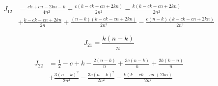 \begin{equation}
\label{J11}
\begin{split}
 J_{12} &= \frac{c k + c n - 2 k n - k}{4 n^2} + \frac{c (k - c k - c n + 2 k n)}{2 n^2} - \frac{k (k - c k - c n + 2 k n)}{2 n^2} \\
& + \frac{k - c k - c n + 2 k n}{2 n} + 
\frac{(n - k) (k - c k - c n + 2 k n)}{2 n^3} - \frac{c (n - k) (k - c k - c n + 2 k n)}{2 n^3}
\end{split}
\end{equation}

\begin{equation}
\label{J21}
J_{21} = \frac{k (n - k)}{n} 
\end{equation}

\begin{equation}
\label{J22}
\begin{split}
J_{22} &= \frac{1}{2} - c + k - \frac{2 (n - k)}{n} + \frac{3 c (n - k)}{n} + \frac{2 k (k - n)}{n} \\ 
 & + \frac{3 (n - k)^2}{2 n^2} - \frac{3 c (n-k)^2}{2 n^2} - \frac{k (k - c k - c n + 2 k n)}{2 n^2}
\end{split}
\end{equation}